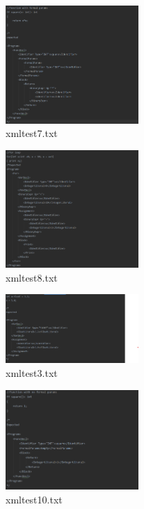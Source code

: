 \documentclass{article}
\begin{document}
\begin{multicols}{2}
					\begin{figure}[H]
					\centering
			 			\includegraphics[width=0.45\textwidth]{xmltest7.png}
			 			\centering
			  			\caption{xmltest7.txt}
			  			\label{fig:xmltest7}
					\end{figure}
					

					
					\begin{figure}[H]
					\centering
			 			\includegraphics[width=0.45\textwidth]{xmltest8.png}
			 			\centering
			  			\caption{xmltest8.txt}
			  			\label{fig:xmltest8}
					\end{figure}

					
										\begin{figure}[H]
					\centering
			 			\includegraphics[width=0.45\textwidth]{xmltest3.png}
			 			\centering
			  			\caption{xmltest3.txt}
			  			\label{fig:xmltest3}
					\end{figure}
					
					
												\begin{figure}[H]
					\centering
			 			\includegraphics[width=0.45\textwidth]{xmltest10.png}
			 			\centering
			  			\caption{xmltest10.txt}
			  			\label{fig:xmltest10}
					\end{figure}
					

\end{multicols}
\end{document}
